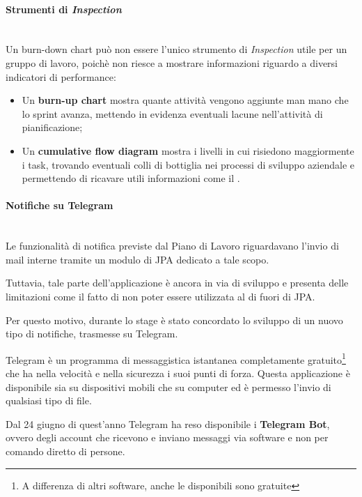 \paragraph{Strumenti di \emph{Inspection}} \mbox{} \\

Un burn-down chart può non essere l'unico strumento di \emph{Inspection} utile
per un gruppo di lavoro, poichè non riesce a mostrare informazioni riguardo a
diversi indicatori di performance:

\begin{itemize}
\item Un \textbf{burn-up chart} mostra quante attività vengono aggiunte man
  mano che lo sprint avanza, mettendo in evidenza eventuali lacune
  nell'attività di pianificazione;
\item Un \textbf{cumulative flow diagram} mostra i livelli in cui risiedono
  maggiormente i task, trovando eventuali colli di bottiglia nei processi di
  sviluppo aziendale e permettendo di ricavare utili informazioni come il
  .
\end{itemize}

\paragraph{Notifiche su Telegram} \mbox{} \\

Le funzionalità di notifica previste dal Piano di Lavoro riguardavano l'invio
di mail interne tramite un modulo di JPA dedicato a tale scopo.

Tuttavia, tale parte dell'applicazione è ancora in via di sviluppo e presenta
delle limitazioni come il fatto di non poter essere utilizzata al di fuori di
JPA.

Per questo motivo, durante lo stage è stato concordato lo sviluppo di un nuovo
tipo di notifiche, trasmesse su Telegram.

Telegram è un programma di messaggistica istantanea completamente
gratuito\footnote{A differenza di altri software, anche le 
disponibili sono gratuite} che ha nella velocità e nella sicurezza i suoi
punti di forza. Questa applicazione è disponibile sia su dispositivi mobili
che su computer ed è permesso l'invio di qualsiasi tipo di file.

Dal 24 giugno di quest'anno Telegram ha reso disponibile i \textbf{Telegram
Bot}, ovvero degli account che ricevono e inviano messaggi via software e non
per comando diretto di persone.

